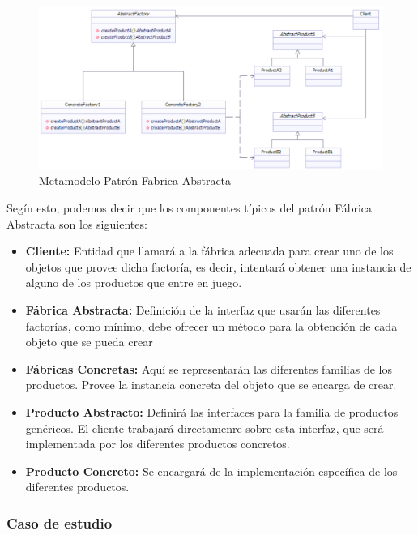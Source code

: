 \begin{figure}[th!]
	\centering
	\includegraphics[width=1\linewidth]{arquitectura/imagenes/modeloFabAbs}
	\caption{Metamodelo Patrón Fabrica Abstracta}
	\label{fig:metamodelo fabrica abstracta}
\end{figure}

Segín esto, podemos decir que los componentes típicos del patrón Fábrica Abstracta son los siguientes:

\begin{itemize}
	\item \textbf{Cliente: }Entidad que llamará a la fábrica adecuada para crear uno de los objetos que provee dicha factoría, es decir, intentará obtener una instancia de alguno de los productos que entre en juego.
	\item \textbf{Fábrica Abstracta: }Definición de la interfaz que usarán las diferentes factorías, como mínimo, debe ofrecer un método para la obtención de cada objeto que se pueda crear
	\item \textbf{Fábricas Concretas: } Aquí se representarán las diferentes familias de los productos. Provee la instancia concreta del objeto que se encarga de crear.
	\item \textbf{Producto Abstracto: }Definirá las interfaces para la familia de productos genéricos. El cliente trabajará directamenre sobre esta interfaz, que será implementada por los diferentes productos concretos.
	\item \textbf{Producto Concreto: } Se encargará de la implementación específica de los diferentes productos.
\end{itemize}



\subsubsection{Caso de estudio}

